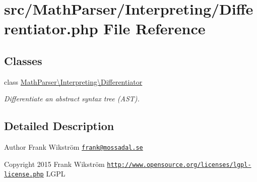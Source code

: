 \hypertarget{Differentiator_8php}{\section{src/\-Math\-Parser/\-Interpreting/\-Differentiator.php File Reference}
\label{Differentiator_8php}
}
\subsection*{Classes}
\begin{DoxyCompactItemize}
\item 
class \hyperlink{classMathParser_1_1Interpreting_1_1Differentiator}{Math\-Parser\textbackslash{}\-Interpreting\textbackslash{}\-Differentiator}
\begin{DoxyCompactList}\small\item\em Differentiate an abstract syntax tree (A\-S\-T). \end{DoxyCompactList}\end{DoxyCompactItemize}


\subsection{Detailed Description}
\begin{DoxyAuthor}{Author}
Frank Wikström \href{mailto:frank@mossadal.se}{\tt frank@mossadal.\-se} 
\end{DoxyAuthor}
\begin{DoxyCopyright}{Copyright}
2015 Frank Wikström  \href{http://www.opensource.org/licenses/lgpl-license.php}{\tt http\-://www.\-opensource.\-org/licenses/lgpl-\/license.\-php} L\-G\-P\-L 
\end{DoxyCopyright}
